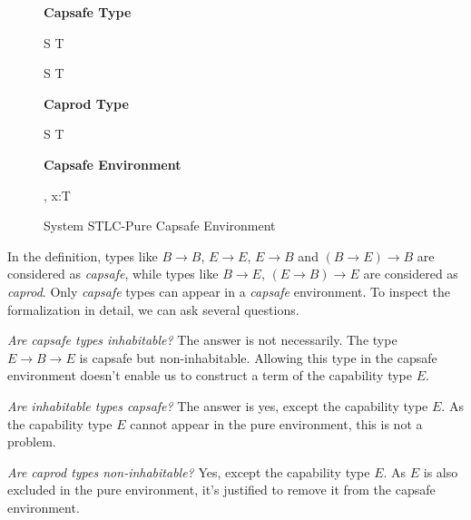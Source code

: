 \begin{figure}[h]
\begin{framed}

\setlength{\columnseprule}{0.4pt}
\begin{multicols}{2}

\textbf{Capsafe Type}


{ S \to T \quad {} }

{ S \to T \quad {} }

\columnbreak

\textbf{Caprod Type}


{ S \to T \quad {} }

\textbf{Capsafe Environment}


{ \Gamma, \; x:T \quad {} }


\end{multicols}
\end{framed}

\caption{System STLC-Pure Capsafe Environment}
\label{fig:stlc-pure-capsafe-definition}
\end{figure}

In the definition, types like $B \to B$, $E \to E$, $E \to B$ and
$(B \to E) \to B$ are considered as \emph{capsafe}, while types like
$B \to E$, $(E \to B) \to E$ are considered as \emph{caprod}. Only
\emph{capsafe} types can appear in a \emph{capsafe} environment. To
inspect the formalization in detail, we can ask several questions.

\emph{Are capsafe types inhabitable?} The answer is not
necessarily. The type $E \to B \to E$ is capsafe but
non-inhabitable. Allowing this type in the capsafe environment doesn't
enable us to construct a term of the capability type $E$.

\emph{Are inhabitable types capsafe?} The answer is yes, except the
capability type $E$. As the capability type $E$ cannot appear in the
pure environment, this is not a problem.

\emph{Are caprod types non-inhabitable?} Yes, except the capability
type $E$. As $E$ is also excluded in the pure environment, it's
justified to remove it from the capsafe environment.

